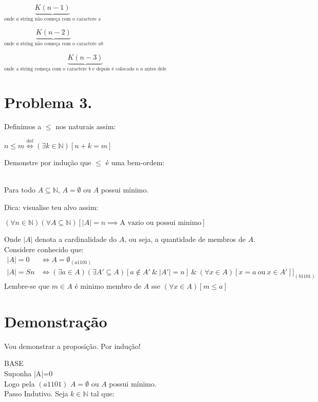 \documentclass[a4paper]{article}
\def\nats{{\mathbb N}}
\begin{document}
$\underbrace{K(n-1)}_{\text{onde $a$ string não começa com o caractere a}}$

$\underbrace{K(n-2)}_{\text{{onde $a$ string não começa com o caractere $ab$}}}$

$\underbrace{K(n-3)}_{\text{{onde a string começa com o caractere $b$ e depois é colocado o $a$ antes dele}}}$

\newpage

\section*{Problema 3.}
Definimos a $\leq$ nos naturais assim:

\begin{center}
$n\leq m \stackrel{\text{def}}{\iff} (\exists k \in \nats)[n+k=m]$ \\
\end{center}
Demonstre por indução que $\leq$ é uma bem-ordem:\\ \
\begin{center}
Para todo $A \subseteq \nats$, $A = \emptyset $ ou $A$ possui mínimo.
\end{center}
Dica: visualise teu alvo assim:
\begin{center}
    $(\forall n \in \nats)(\forall A \subseteq \nats)[|A|=n \implies \text{A vazio ou possui minimo}]$
\end{center}

Onde $|A|$ denota a cardinalidade do $A$, ou seja, a quantidade de membros de $A$. 
Considere conhecido que:\\
\begin{align*}
|A|=0 & \iff A = \emptyset _{(a1101)}      &&    \\
|A|=Sn& \iff (\exists a \in A)(\exists A'\subseteq A)[a\notin A' \ \& \ |A'| = n] \ \& \ (\forall x \in A)[x=a \ \text{ou} \ x \in A']]  _{(b1101)}    &&
\end{align*}
Lembre-se que $m \in A$ é minimo membro de $A$ sse $(\forall x \in A)[m \leq a]$

\section*{Demonstração}

Vou demonstrar a proposição.\newline
Por indução!

BASE\\
Suponha |A|=0 \\
Logo pela $(a1101)$ $A = \emptyset $ ou $A$ possui mínimo.\\
Passo Indutivo. Seja $k\in \nats$ tal que:\\
\end{document}
